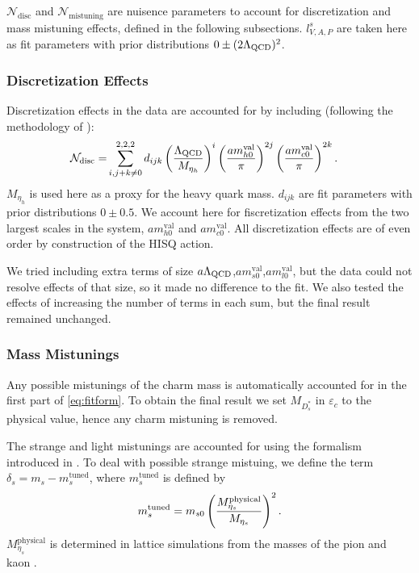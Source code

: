$\mathcal{N}_{\text{disc}}$ and $\mathcal{N}_{\text{mistuning}}$ are nuisence parameters to account for discretization and mass mistuning effects, defined in the following subsections. $l_{V,A,P}^s$ are taken here as fit parameters with prior distributions $0\pm (2\Lambda_{\text{QCD}})^2$.

\subsubsection{Discretization Effects}

Discretization effects in the data are accounted for by including (following the methodology of \cite{McNeile:2012qf}):
\begin{align}
    \label{eq:fitfun_hA1}
  \mathcal{N}_{\text{disc}} = &\sum_{i,j+k\neq 0}^{2,2,2} d_{ijk} \left({\Lambda_{\text{QCD}}\over M_{\eta_h} }\right)^{i} \left({ am^{\text{val}}_{h0} \over \pi }\right)^{2j} \left({ am^{\text{val}}_{c0} \over \pi }\right)^{2k}.
\end{align}
$M_{\eta_h}$ is used here as a proxy for the heavy quark mass. $d_{ijk}$ are fit parameters with prior distributions $0\pm 0.5$. We account here for fiscretization effects from the two largest scales in the system, $am^{\text{val}}_{h0}$ and $am^{\text{val}}_{c0}$. All discretization effects are of even order by construction of the HISQ action.

We tried including extra terms of size $a\Lambda_{\text{QCD}}$,$am^{\text{val}}_{s0}$,$am^{\text{val}}_{l0}$, but the data could not resolve effects of that size, so it made no difference to the fit. We also tested the effects of increasing the number of terms in each sum, but the final result remained unchanged.

\subsubsection{Mass Mistunings}

Any possible mistunings of the charm mass is automatically accounted for in the first part of \eqref{eq:fitform}. To obtain the final result we set $M_{D_s^*}$ in $\varepsilon_c$ to the physical value, hence any charm mistuning is removed.

The strange and light mistunings are accounted for using the formalism introduced in \cite{Chakraborty:2014aca}. To deal with possible strange mistuing, we define the term $\delta_s = m_s - m_s^{\text{tuned}}$, where $m_s^{\text{tuned}}$ is defined by
\begin{align}
  m_s^{\text{tuned}} = m_{s0} \left({ M^{\text{physical}}_{\eta_s} \over M_{\eta_s} }\right)^2.
\end{align}
$M_{\eta_s}^{\text{physical}}$ is determined in lattice simulations from the masses of the pion and kaon \cite{Dowdall:2013rya}.

